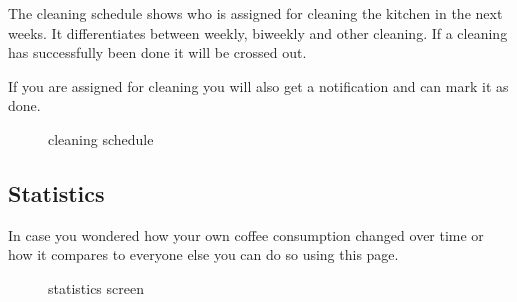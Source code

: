 The cleaning schedule shows who is assigned for cleaning the kitchen in
the next weeks. It differentiates between weekly, biweekly and other
cleaning. If a cleaning has successfully been done it will be crossed
out.

If you are assigned for cleaning you will also get a notification and
can mark it as done.

\begin{figure}[htbp]
\centering
{}
\caption{cleaning schedule}
\end{figure}

\subsection{Statistics}\label{statistics-2}

In case you wondered how your own coffee consumption changed over time
or how it compares to everyone else you can do so using this page.

\begin{figure}[htbp]
\centering
{}
\caption{statistics screen}
\end{figure}

